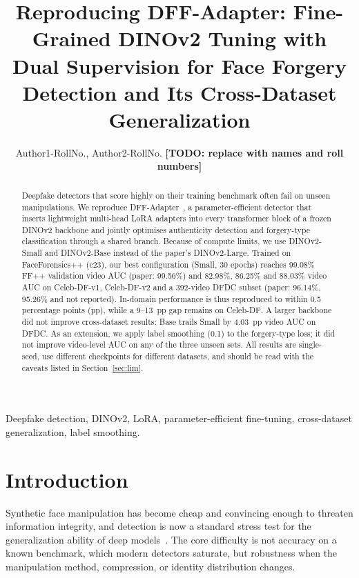 \documentclass[lettersize,journal]{IEEEtran}
\newcommand{\todo}[1]{\textbf{[TODO: #1]}}
\begin{document}
\title{Reproducing DFF-Adapter: Fine-Grained DINOv2 Tuning with Dual Supervision for Face Forgery Detection and Its Cross-Dataset Generalization}

\author{Author1-RollNo., Author2-RollNo. \todo{replace with names and roll numbers}}

\maketitle

\begin{abstract}
Deepfake detectors that score highly on their training benchmark often fail on unseen manipulations. We reproduce DFF-Adapter~\cite{zhang2026dff}, a parameter-efficient detector that inserts lightweight multi-head LoRA adapters into every transformer block of a frozen DINOv2 backbone and jointly optimises authenticity detection and forgery-type classification through a shared branch. Because of compute limits, we use DINOv2-Small and DINOv2-Base instead of the paper's DINOv2-Large. Trained on FaceForensics++ (c23), our best configuration (Small, 30 epochs) reaches 99.08\% FF++ validation video AUC (paper: 99.56\%) and 82.98\%, 86.25\% and 88.03\% video AUC on Celeb-DF-v1, Celeb-DF-v2 and a 392-video DFDC subset (paper: 96.14\%, 95.26\% and not reported). In-domain performance is thus reproduced to within 0.5 percentage points (pp), while a 9--13~pp gap remains on Celeb-DF. A larger backbone did not improve cross-dataset results: Base trails Small by 4.03~pp video AUC on DFDC. As an extension, we apply label smoothing (0.1) to the forgery-type loss; it did not improve video-level AUC on any of the three unseen sets. All results are single-seed, use different checkpoints for different datasets, and should be read with the caveats listed in Section~\ref{sec:lim}.
\end{abstract}

\begin{IEEEkeywords}
Deepfake detection, DINOv2, LoRA, parameter-efficient fine-tuning, cross-dataset generalization, label smoothing.
\end{IEEEkeywords}

\section{Introduction}
Synthetic face manipulation has become cheap and convincing enough to threaten information integrity, and detection is now a standard stress test for the generalization ability of deep models~\cite{lecun2015deep}. The core difficulty is not accuracy on a known benchmark, which modern detectors saturate, but robustness when the manipulation method, compression, or identity distribution changes.
\end{document}
